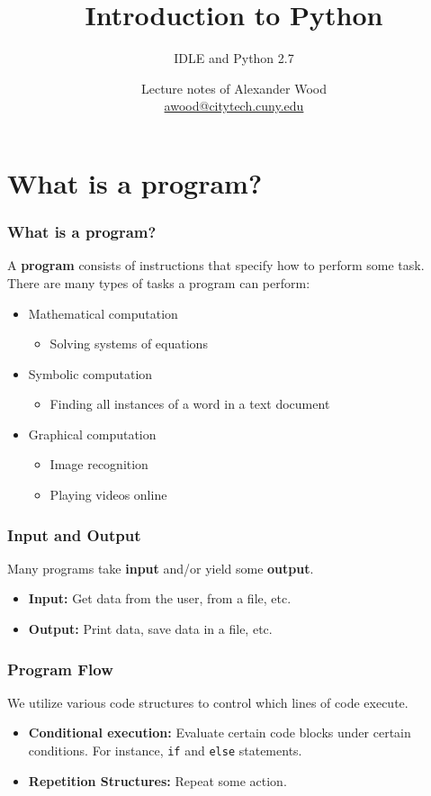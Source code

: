 \documentclass{beamer}
\title[Intro to Python]{Introduction to Python}
\subtitle{IDLE and Python 2.7}
\author
{Lecture notes of Alexander Wood \\ \scriptsize \href{mailto:awood@citytech.cuny.edu}{awood@citytech.cuny.edu}}
\institute[CityTech]{New York City College of Technology }
\date{}
\newcommand{\<}{\langle}
\renewcommand{\>}{\rangle}
\begin{document}
\begin{frame}
  \titlepage
\end{frame}



\section{What is a program?}


\begin{frame}
\frametitle{What is a program?}

A \textbf{program} consists of instructions that specify how to perform some task. There are many types of tasks a program can perform: 
\begin{itemize}
\item Mathematical computation
	\begin{itemize}
	\item Solving systems of equations
	\end{itemize}
\item Symbolic computation
	\begin{itemize}
	\item Finding all instances of a word in a text document
	\end{itemize}
\item Graphical computation
	\begin{itemize}
	\item Image recognition
	\item Playing videos online
	\end{itemize}
\end{itemize}
\end{frame}

\begin{frame}
\frametitle{Input and Output}

Many programs take \textbf{input} and/or yield some \textbf{output}.

\begin{itemize}
\item
\textbf{Input:} Get data from the user, from a file, etc.
\item \textbf{Output:} Print data, save data in a file, etc.
\end{itemize}
\end{frame}

\begin{frame}[fragile]
\frametitle{Program Flow}

We utilize various code structures to control which lines of code execute.

\begin{itemize}
\item\textbf{Conditional execution:} Evaluate certain code blocks under certain conditions. For instance, \verb|if| and \verb|else| statements.
\item\textbf{Repetition Structures:} Repeat some action.
\end{itemize}
\end{frame}
\end{document}
